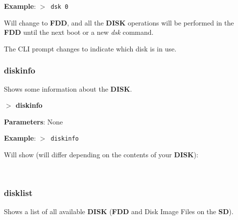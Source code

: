\documentclass[a4paper,11pt]{article}
\begin{document}
        \textbf{Example}: \texttt{$>$ dsk 0}

        Will change to \textbf{FDD}, and all the \textbf{DISK} operations will
        be performed in the \textbf{FDD} until the next boot or a new \textit{dsk}
        command.

        The CLI prompt changes to indicate which disk is in use.

        \subsubsection{{\color{blue}diskinfo}}
        Shows some information about the \textbf{DISK}.

        \hspace{1.9cm}\textbf{$>$ diskinfo}

        \textbf{Parameters}: None

        \textbf{Example}: \texttt{$>$ diskinfo}

        Will show (will differ depending on the contents of your \textbf{DISK}):

        \texttt{
        }

        \subsubsection{{\color{blue}disklist}}
        Shows a list of all available \textbf{DISK} (\textbf{FDD} and Disk Image
        Files on the \textbf{SD}).
\end{document}
